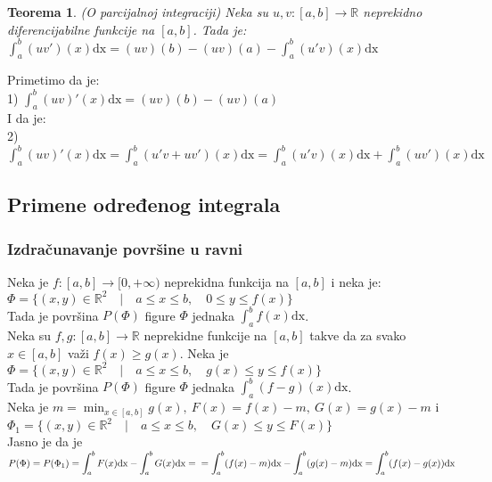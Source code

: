 \documentclass{article}
\newtheorem{teorema}{Teorema}[section]
\begin{document}
\begin{teoremabox}
    \begin{teorema}
        (O parcijalnoj integraciji) Neka su $u, v: [a, b] \longrightarrow\mathbb{R}$ neprekidno diferencijabilne funkcije na $[a,b]$. Tada je:\\
        $\displaystyle\int^b_a(uv')(x)\text{dx} = (uv)(b) - (uv)(a) - \int^b_a(u'v)(x)\text{dx}$
    \end{teorema}
\end{teoremabox}
Primetimo da je:\\
1) $\displaystyle\int^b_a (uv)'(x)\text{dx} = (uv)(b) - (uv)(a)$\\
I da je:\\
2) $\displaystyle\int^b_a (uv)'(x)\text{dx} = \int^b_a(u'v + uv')(x)\text{dx} = \int^b_a(u'v)(x)\text{dx} + \int^b_a(uv')(x)\text{dx}$
\subsection{Primene određenog integrala}
\subsubsection{Izdračunavanje površine u ravni}
Neka je $f:[a, b] \longrightarrow[0,+\infty)$ neprekidna funkcija na $[a,b]$ i neka je:\\
$\Phi = \{(x,y)\in\mathbb{R}^2\quad|\quad a\leq x\leq b,\quad 0\leq y\leq f(x)\}$\\
Tada je površina $P(\Phi)$ figure $\Phi$ jednaka $\displaystyle\int^b_a f(x)\text{dx}$.\\
Neka su $f,g:[a,b]\longrightarrow\mathbb{R}$ neprekidne funkcije na $[a,b]$ takve da za svako $x\in[a,b]$ važi $f(x) \geq g(x)$. Neka je $\Phi = \{(x,y)\in\mathbb{R}^2\quad|\quad a\leq x\leq b,\quad g(x)\leq y\leq f(x)\}$\\
Tada je površina $P(\Phi)$ figure $\Phi$ jednaka $\displaystyle\int^b_a (f-g)(x)\text{dx}$.\\
Neka je $\displaystyle m = \min_{x\in[a,b]} g(x),\ F(x) = f(x) - m,\ G(x) = g(x) - m$ i\\
$\Phi_1 = \{(x,y)\in\mathbb{R}^2\quad|\quad a\leq x\leq b,\quad G(x)\leq y\leq F(x)\}$\\
Jasno je da je $P(\Phi) = P(\Phi_1) = \displaystyle\int^b_aF(x)\text{dx} - \int^b_aG(x)\text{dx} =\\= \int^b_a (f(x)-m)\text{dx}-\int^b_a(g(x)-m)\text{dx} = \int^b_a(f(x)-g(x))\text{dx}$\\
\end{document}
